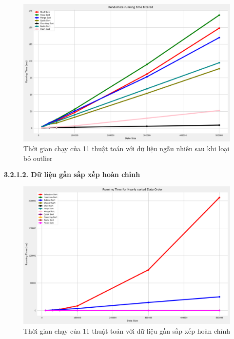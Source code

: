 \begin{figure}[H]
    \centering
    \includegraphics[width=\textwidth]{experimental_result/images/randomize_running_time_filtered.png}
    \caption{Thời gian chạy của 11 thuật toán với dữ liệu ngẫu nhiên sau khi loại bỏ outlier}
    \label{fig:randomize_running_time_filtered}
\end{figure}




\textbf{3.2.1.2. Dữ liệu gần sắp xếp hoàn chỉnh}

\begin{figure}[H]
    \centering
    \includegraphics[width=\textwidth]{experimental_result/images/nearly_sorted_running_time.png}
    \caption{Thời gian chạy của 11 thuật toán với dữ liệu gần sắp xếp hoàn chỉnh}
    \label{fig:nearly_sorted_running_time}
\end{figure}


